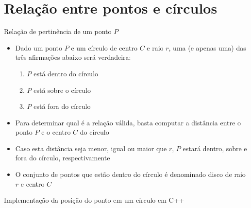 \section{Relação entre pontos e círculos}

\begin{frame}[fragile]{Relação de pertinência de um ponto $P$}

    \begin{itemize}
        \item Dado um ponto $P$ e um círculo de centro $C$ e raio $r$, uma (e apenas uma) das três 
            afirmações abaixo será verdadeira:

        \begin{enumerate}
            \item $P$ está dentro do círculo
            \item $P$ está sobre o círculo
            \item $P$ está fora do círculo
        \end{enumerate}

        \item Para determinar qual é a relação válida, basta computar a distância entre o ponto $P$
            e o centro $C$ do círculo

        \item Caso esta distância seja menor, igual ou maior que $r$, $P$ estará dentro, sobre e 
            fora do círculo, respectivamente

        \item O conjunto de pontos que estão dentro do círculo é denominado disco de raio $r$ e
            centro $C$
   \end{itemize}
\end{frame}

\begin{frame}[fragile]{Implementação da posição do ponto em um círculo em C++}
\end{frame}

